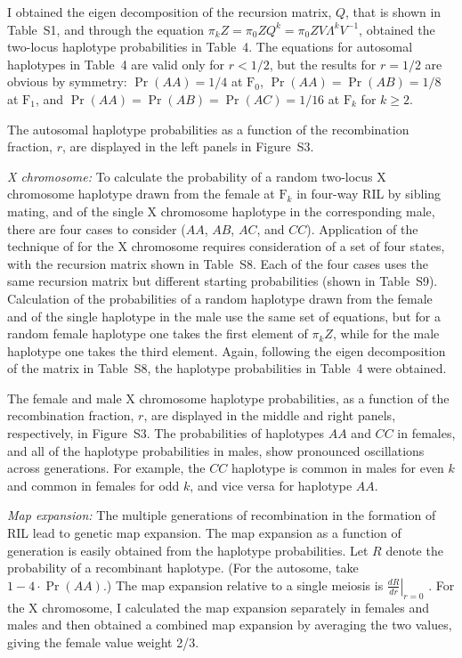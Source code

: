 \documentclass[12pt,letterpaper]{article}
\begin{document}
I obtained the eigen decomposition of the recursion matrix, $Q$, that
is shown in
Table~S1, and through the equation $\pi_k Z = \pi_0 Z Q^k = \pi_0 Z V
\Lambda^k V^{-1}$, obtained the two-locus haplotype probabilities in Table~4.  
The equations for autosomal haplotypes in Table~4 are valid only for
$r < 1/2$, but the results for $r=1/2$ are obvious by symmetry:
$\Pr(AA)=1/4$ at $\text{F}_0$, $\Pr(AA) = \Pr(AB) = 1/8$ at
$\text{F}_1$, and $\Pr(AA) = \Pr(AB) = \Pr(AC) = 1/16$ at $\text{F}_k$
for $k \ge 2$.  

The autosomal haplotype probabilities as a function of the
recombination fraction, $r$, are displayed in the left panels in
Figure~S3. 

\emph{X chromosome:} To calculate the probability of a random
two-locus X chromosome haplotype drawn from the female
at $\text{F}_k$ in four-way RIL by sibling mating, and of the single X
chromosome haplotype in the corresponding male, there
are four cases to consider ($AA$, $AB$, $AC$, and $CC$).  
Application of the technique of \citet{Kimura1963} for the X chromosome
requires consideration of a set of four states, with the recursion
matrix shown in Table~S8.  Each of the four cases uses the same
recursion matrix but different starting probabilities (shown in
Table~S9).  Calculation of the probabilities of a random haplotype drawn
from the female and of the single haplotype in the male use the same
set of equations, but for a random female haplotype one takes the first
element of $\pi_k Z$, while for the male haplotype one takes the third element.
Again, following the eigen decomposition of the matrix in Table~S8, 
the haplotype probabilities in Table~4 were obtained.


The female and male X chromosome haplotype probabilities, as a function
of the recombination fraction, $r$, are displayed in the middle
and right panels, respectively, in Figure~S3.  The probabilities of
haplotypes $AA$ and $CC$ in females, and all of the haplotype
probabilities in males, show pronounced oscillations across generations.
For example, the $CC$
haplotype is common in males for even $k$ and common in females for
odd $k$, and vice versa for haplotype $AA$.


\emph{Map expansion:} The multiple generations of recombination in the
formation of RIL lead to genetic map expansion.  
The map expansion as a function of generation is
easily obtained from the haplotype probabilities.  Let $R$ denote the
probability of a recombinant haplotype.  (For the autosome, take $1 - 4
\cdot \Pr(AA)$.)  The map expansion relative to a single meiosis is
$\left. \frac{dR}{dr} \right|_{r=0}$ \citep[see][]{Teuscher2007}.
For the X chromosome, I calculated the map expansion separately in
females and males and then obtained a combined map expansion by
averaging the two values, giving the female value weight 2/3.
\end{document}
